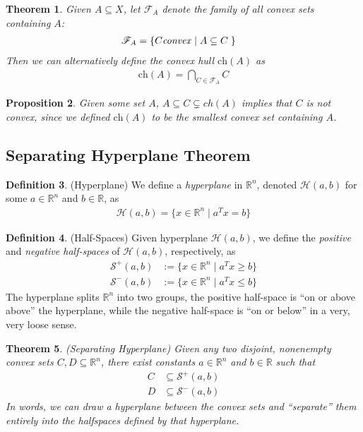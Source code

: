\documentclass[12pt]{book}
\numberwithin{equation}{section} %
\theoremstyle{plain}
\newtheorem{thm}{Theorem}[section]
\newtheorem{prop}[thm]{Proposition}
\theoremstyle{definition}
\newtheorem{defn}[thm]{Definition}
\theoremstyle{remark}
\newcommand{\ch}{\text{ch}}
\newcommand{\R}{\mathbb{R}}
\newcommand{\Rn}{\mathbb{R}^n}
\begin{document}
\begin{thm}
Given $A\subseteq X$, let $\mathscr{F}_A$ denote the family of all
convex sets containing $A$:
\begin{align*}
  \mathscr{F}_A &= \{C\text{\emph{convex}} \;|\; A \subseteq C \; \}
\end{align*}
Then we can alternatively define the convex hull $\ch(A)$ as
\begin{align*}
  \ch(A) = \bigcap_{C \in \mathscr{F}_A} C
\end{align*}
\end{thm}

\begin{prop}
Given some set $A$, $A \subseteq C \subsetneq ch(A)$ implies that $C$ is
not convex, since we defined $\ch(A)$ to be the smallest convex set
containing $A$.
\end{prop}

\subsection{Separating Hyperplane Theorem}

\begin{defn}{(Hyperplane)}
We define a \emph{hyperplane} in $\Rn$, denoted $\mathcal{H}(a,b)$
for some $a\in \Rn$ and $b\in \R$, as
\begin{align*}
  \mathcal{H}(a,b) = \{x\in\Rn \; | \; a^Tx = b\}
\end{align*}
\end{defn}

\begin{defn}{(Half-Spaces)}
Given hyperplane $\mathcal{H}(a,b)$, we define the \emph{positive} and
\emph{negative half-spaces} of $\mathcal{H}(a,b)$, respectively, as
\begin{align*}
  \mathcal{S}^+(a,b)
  &:= \{ x \in \Rn \; |\; a^T x \geq b\} \\
  \mathcal{S}^-(a,b)
  &:= \{ x \in \Rn \; |\; a^T x \leq b\}
\end{align*}
The hyperplane splits $\Rn$ into two groups, the positive half-space is
``on or above above'' the hyperplane, while the negative half-space is
``on or below'' in a very, very loose sense.
\end{defn}

\begin{thm}{\emph{(Separating Hyperplane)}}
Given any two disjoint, nonenempty convex sets $C,D\subseteq\Rn$, there
exist constants $a\in\Rn$ and $b\in\R$ such that
\begin{align*}
  C &\subseteq \mathcal{S}^+(a,b) \\
  D &\subseteq \mathcal{S}^-(a,b)
\end{align*}
In words, we can draw a hyperplane between the convex sets and
``separate'' them entirely into the halfspaces defined by that
hyperplane.
\end{thm}
\end{document}
